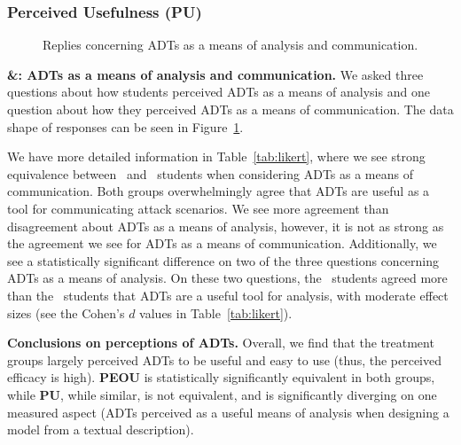 \subsubsection{Perceived Usefulness (\textbf{PU})}


\begin{figure}[t]
    \caption{Replies concerning ADTs as a means of analysis and communication.}
    \label{fig:means-of-commanalysis}
\end{figure}


\textbf{\hypothesis{\hypoCommunicationTool}\&\hypothesis{\hypoAnalysisTool}: ADTs as a means of analysis and communication.}
We asked three questions about how students perceived ADTs as a means of analysis and one question about how they perceived ADTs as a means of communication. The data shape of responses can be seen in Figure~\ref{fig:means-of-commanalysis}.



We have more detailed information in Table~\ref{tab:likert}, where we see strong equivalence between \ICS\ and \SEC\ students when considering ADTs as a means of communication. Both groups overwhelmingly agree that ADTs are useful as a tool for communicating attack scenarios. We see more agreement than disagreement about ADTs as a means of analysis, however, it is not as strong as the agreement we see for ADTs as a means of communication. Additionally, we see a statistically significant difference on two of the three questions concerning ADTs as a means of analysis. On these two questions, the \ICS\ students agreed more than the \SEC\ students that ADTs are a useful tool for analysis, with moderate effect sizes (see the Cohen's $d$ values in Table~\ref{tab:likert}).




\textbf{Conclusions on perceptions of ADTs.}
Overall, we find that the treatment groups largely perceived ADTs to be useful and easy to use (thus, the perceived efficacy is high). \textbf{PEOU} is statistically significantly equivalent in both groups, while \textbf{PU}, while similar, is not equivalent, and is significantly diverging on one measured aspect (ADTs perceived as a useful means of analysis when designing a model from a textual description). 

